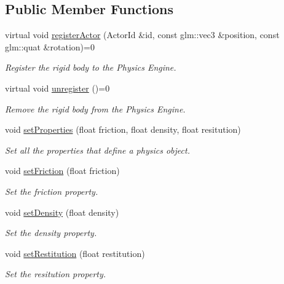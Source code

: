 \subsection*{Public Member Functions}
\begin{DoxyCompactItemize}
\item 
virtual void \hyperlink{classTarbora_1_1RigidBody_acd1c63e93fd607f74f48fb68aa764b29}{register\+Actor} (Actor\+Id \&id, const glm\+::vec3 \&position, const glm\+::quat \&rotation)=0
\begin{DoxyCompactList}\small\item\em Register the rigid body to the Physics Engine. \end{DoxyCompactList}\item 
\mbox{\label{classTarbora_1_1RigidBody_a7bd0fc405871ebaf67fe6eb2b7d8ef73}} 
virtual void \hyperlink{classTarbora_1_1RigidBody_a7bd0fc405871ebaf67fe6eb2b7d8ef73}{unregister} ()=0
\begin{DoxyCompactList}\small\item\em Remove the rigid body from the Physics Engine. \end{DoxyCompactList}\item 
void \hyperlink{classTarbora_1_1RigidBody_a4ef35440e9a86d070ec05f507b1a3e26}{set\+Properties} (float friction, float density, float resitution)
\begin{DoxyCompactList}\small\item\em Set all the properties that define a physics object. \end{DoxyCompactList}\item 
void \hyperlink{classTarbora_1_1RigidBody_ada1b1247d514beb54c11a5baa4a065cf}{set\+Friction} (float friction)
\begin{DoxyCompactList}\small\item\em Set the friction property. \end{DoxyCompactList}\item 
void \hyperlink{classTarbora_1_1RigidBody_af6eb6a7aaf2eba4d1375ba40ca89bcdd}{set\+Density} (float density)
\begin{DoxyCompactList}\small\item\em Set the density property. \end{DoxyCompactList}\item 
void \hyperlink{classTarbora_1_1RigidBody_a52dd135d02cb25601ed62bb94a895fb8}{set\+Restitution} (float restitution)
\begin{DoxyCompactList}\small\item\em Set the resitution property. \end{DoxyCompactList}\item 

\end{DoxyCompactItemize}
